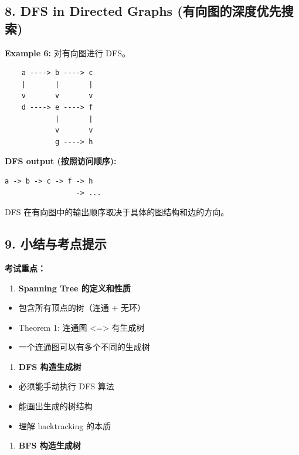 \documentclass[10pt,a4paper,openany]{ctexbook}
\theoremstyle{definition}
\theoremstyle{remark}
\begin{document}
\subsection{8. DFS in Directed Graphs (有向图的深度优先搜索)}

\textbf{Example 6:} 对有向图进行 DFS。
{\footnotesize\begin{verbatim}
    a ----> b ----> c
    |       |       |
    v       v       v
    d ----> e ----> f
            |       |
            v       v
            g ----> h
\end{verbatim}}

\textbf{DFS output (按照访问顺序):}
{\footnotesize\begin{verbatim}
a -> b -> c -> f -> h
                 -> ...
\end{verbatim}}

DFS 在有向图中的输出顺序取决于具体的图结构和边的方向。
\vspace{-2pt}

\subsection{9. 小结与考点提示}

\textbf{考试重点：}
\begin{enumerate}
\item \textbf{Spanning Tree 的定义和性质}
\end{enumerate}

\begin{itemize}
\item 包含所有顶点的树（连通 + 无环）
\item Theorem 1: 连通图 <=> 有生成树
\item 一个连通图可以有多个不同的生成树

\end{itemize}

\begin{enumerate}
\item \textbf{DFS 构造生成树}
\end{enumerate}

\begin{itemize}
\item 必须能手动执行 DFS 算法
\item 能画出生成的树结构
\item 理解 backtracking 的本质

\end{itemize}

\begin{enumerate}
\item \textbf{BFS 构造生成树}
\end{enumerate}
\end{document}

